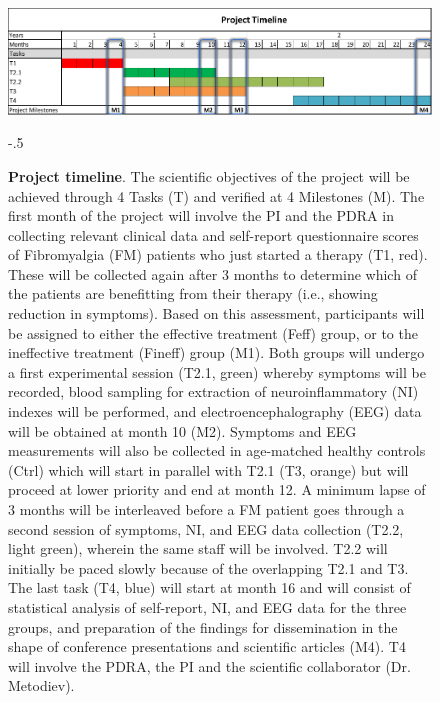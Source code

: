 \documentclass[twocolumn,  rga,issue, numeric]{jote-new-article}
\begin{document}
\begin{figure}
\captionsetup{width=\dimexpr \linewidth+\fullwidthlen\relax}
\begin{fullwidth}
 \includegraphics[width=\linewidth]{media/fig1.pdf}
  \end{fullwidth}
 \begin{adjustwidth}{-.5\fullwidthlen}{}
  

\caption{\textbf{Project timeline}.  The scientific objectives of the project will be achieved through 4 Tasks (T) and verified at 4 Milestones (M). The first month of the project will involve the PI and the PDRA in collecting relevant clinical data and self-report questionnaire scores of Fibromyalgia (FM) patients who just started a therapy (T1, red). These will be collected again after 3 months to determine which of the patients are benefitting from their therapy (i.e., showing reduction in symptoms). Based on this assessment, participants will be assigned to either the effective treatment (Feff) group, or to the ineffective treatment (Fineff) group (M1). Both groups will undergo a first experimental session (T2.1, green) whereby symptoms will be recorded, blood sampling for extraction of neuroinflammatory (NI) indexes will be performed, and electroencephalography (EEG) data will be obtained at month 10 (M2). Symptoms and EEG measurements will also be collected in age-matched healthy controls (Ctrl) which will start in parallel with T2.1 (T3, orange) but will proceed at lower priority and end at month 12. A minimum lapse of 3 months will be interleaved before a FM patient goes through a second session of symptoms, NI, and EEG data collection (T2.2, light green), wherein the same staff will be involved. T2.2 will initially be paced slowly because of the overlapping T2.1 and T3. The last task (T4, blue) will start at month 16 and will consist of statistical analysis of self-report, NI, and EEG data for the three groups, and preparation of the findings for dissemination in the shape of conference presentations and scientific articles (M4). T4 will involve the PDRA, the PI and the scientific collaborator (Dr. Metodiev).}
\end{adjustwidth}
\end{figure}
\end{document}
